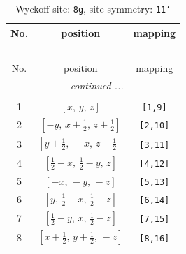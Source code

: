 \documentclass[fleqn,8pt]{jsarticle}
\begin{document}
\renewcommand{\arraystretch}{1.2}
\begin{longtable}{ccc}
\caption{Wyckoff site: {\tt 8g}, site symmetry: {\tt 11'}}
 \\
 \hline \hline
No. & position & mapping \\ \hline \endfirsthead

\multicolumn{2}{l}{\tablename\ \thetable{}} \\
 \hline \hline
No. & position & mapping \\ \hline \endhead

 \hline \hline
\multicolumn{2}{r}{\footnotesize\it continued ...} \\ \endfoot

 \hline \hline
\multicolumn{2}{r}{} \\ \endlastfoot

1 & $\left[ x,\, y,\, z \right]$ & {\tt [1,9]} \\ \hline
2 & $\left[ - y,\, x + \frac{1}{2},\, z + \frac{1}{2} \right]$ & {\tt [2,10]} \\ \hline
3 & $\left[ y + \frac{1}{2},\, - x,\, z + \frac{1}{2} \right]$ & {\tt [3,11]} \\ \hline
4 & $\left[ \frac{1}{2} - x,\, \frac{1}{2} - y,\, z \right]$ & {\tt [4,12]} \\ \hline
5 & $\left[ - x,\, - y,\, - z \right]$ & {\tt [5,13]} \\ \hline
6 & $\left[ y,\, \frac{1}{2} - x,\, \frac{1}{2} - z \right]$ & {\tt [6,14]} \\ \hline
7 & $\left[ \frac{1}{2} - y,\, x,\, \frac{1}{2} - z \right]$ & {\tt [7,15]} \\ \hline
8 & $\left[ x + \frac{1}{2},\, y + \frac{1}{2},\, - z \right]$ & {\tt [8,16]} \\
\end{longtable}
\end{document}
